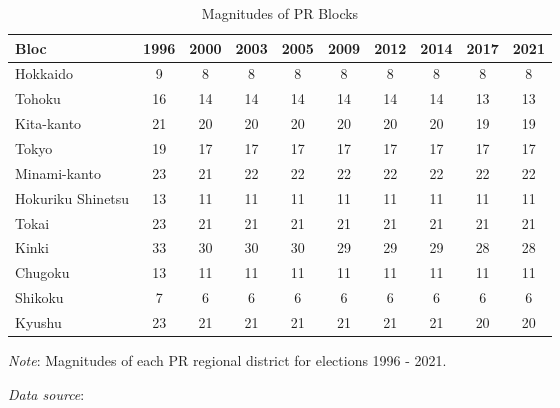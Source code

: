 \begin{table}[!htbp]
\begin{threeparttable}
\begin{tabular}{lccccccccc}
\toprule
Bloc & 1996 & 2000 & 2003 & 2005 & 2009 & 2012 & 2014 & 2017 & 2021 \\
\midrule
Hokkaido & 9 & 8 & 8 & 8 & 8 & 8 & 8 & 8 & 8 \\
Tohoku & 16 & 14 & 14 & 14 & 14 & 14 & 14 & 13 & 13 \\
Kita-kanto & 21 & 20 & 20 & 20 & 20 & 20 & 20 & 19 & 19 \\
Tokyo & 19 & 17 & 17 & 17 & 17 & 17 & 17 & 17 & 17 \\
Minami-kanto & 23 & 21 & 22 & 22 & 22 & 22 & 22 & 22 & 22 \\
Hokuriku Shinetsu & 13 & 11 & 11 & 11 & 11 & 11 & 11 & 11 & 11 \\
Tokai & 23 & 21 & 21 & 21 & 21 & 21 & 21 & 21 & 21 \\
Kinki & 33 & 30 & 30 & 30 & 29 & 29 & 29 & 28 & 28 \\
Chugoku & 13 & 11 & 11 & 11 & 11 & 11 & 11 & 11 & 11 \\
Shikoku & 7 & 6 & 6 & 6 & 6 & 6 & 6 & 6 & 6 \\
Kyushu & 23 & 21 & 21 & 21 & 21 & 21 & 21 & 20 & 20 \\
\bottomrule
\end{tabular}
\begin{tablenotes}[flushleft]
  \scriptsize{
    \item \textit{Note}: Magnitudes of each PR regional district for elections 1996 - 2021. 
    \item \textit{Data source}: \citet{reedReedSmithJapaneseHouse2017, ministryofinternalaffairsandcommunicationsElectionSenkyo2024}
  }
\end{tablenotes}
\end{threeparttable}
\caption{Magnitudes of PR Blocks}
\label{tab:distM}
\end{table}